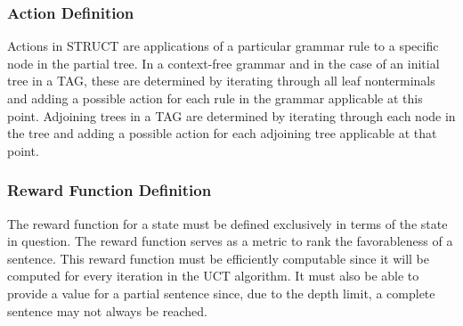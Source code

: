  \subsubsection{Action Definition}

 Actions in STRUCT are applications of a particular grammar rule to a specific node in the partial tree.  In a context-free grammar and in the case of an initial tree in a TAG, these are determined by iterating through all leaf nonterminals and adding a possible action for each rule in the grammar applicable at this point.  Adjoining trees in a TAG are determined by iterating through each node in the tree and adding a possible action for each adjoining tree applicable at that point.\\


 \subsubsection{Reward Function Definition}

 The reward function for a state must be defined exclusively in terms
 of the state in question.  The reward function serves as a metric to
 rank the favorableness of a sentence.  This reward function must be
 efficiently computable since it will be computed for every iteration
 in the UCT algorithm.  It must also be able to provide a value for a
 partial sentence since, due to the depth limit, a complete sentence
 may not always be reached.

